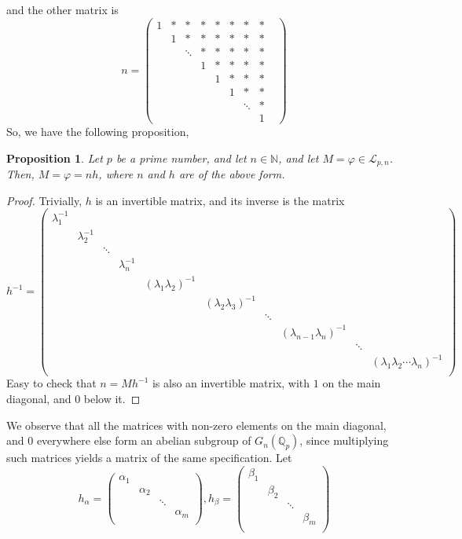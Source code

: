 \documentclass[12pt]{article}
\newtheorem{proposition}[theorem]{Proposition}
\begin{document}
and the other matrix is $$n=\begin{pmatrix}
1 &* &* &* &* &* &* & *\\
& 1 &* &* &* &* &* &*\\
& & \ddots & *& *& *& *& *&\\
& & & 1 &* &* & *& *\\
& & & & 1 &* &* & *\\
& & & & & 1 & *& *\\
& & & & & & \ddots & *\\
& & & & & & & 1
\end{pmatrix}
$$
So, we have the following proposition,
\begin{proposition}
\label{prop.automorphism.matrix,decomposition}
Let $p$ be a prime number, and let $n\in\mathbb{N}$, and let $M=\varphi\in\mathcal{L}_{p,n}$. Then, $M=\varphi=nh$, where $n$ and $h$ are of the above form.
\end{proposition}
\begin{proof}
Trivially, $h$ is an invertible matrix, and its inverse is the matrix $$h^{-1}=\begin{pmatrix}
\lambda_1^{-1} & & & & & & & &\\
& \lambda_2^{-1} & & & & & & &\\
& & \ddots & & & & & &\\
& & & \lambda_n^{-1} & & & & &\\
& & & & (\lambda_1\lambda_2)^{-1} & & & &\\
& & & & & (\lambda_2\lambda_3)^{-1} & & &\\
& & & & & & \ddots & &\\
& & & & & & & (\lambda_{n-1}\lambda_n)^{-1} & &\\
& & & & & & & & \ddots &\\
& & & & & & & & & (\lambda_1\lambda_2\cdots\lambda_n)^{-1}\\
\end{pmatrix}
$$
Easy to check that $n=Mh^{-1}$ is also an invertible matrix, with $1$ on the main diagonal, and $0$ below it.
\end{proof}
We observe that all the matrices with non-zero elements on the main diagonal, and $0$ everywhere else form an abelian subgroup of $G_n(\mathbb{Q}_p)$, since multiplying such matrices yields a matrix of the same specification. Let $$h_{\alpha}=\begin{pmatrix}
\alpha_1 & & &\\
& \alpha_2 & &\\
& & \ddots &\\
& & & \alpha_m\\
\end{pmatrix},h_{\beta}=\begin{pmatrix}
\beta_1 & & &\\
& \beta_2 & &\\
& & \ddots &\\
& & & \beta_m\\
\end{pmatrix}$$
\end{document}
